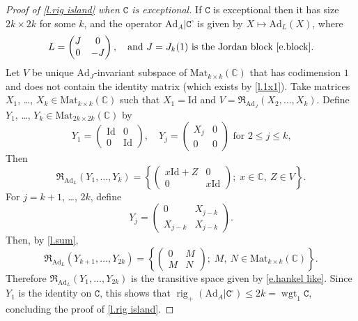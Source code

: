 \documentclass[10pt, a4paper]{amsart}
\theoremstyle{plain}
\theoremstyle{definition}
\theoremstyle{remark}
\theoremstyle{note}
\numberwithin{equation}{section}
\begin{document}
\begin{proof}[Proof of \cref{l.rig island} when ${\mathtt{C}}$ is exceptional]
If ${\mathtt{C}}$ is exceptional then it has size $2k \times 2k$ for some $k$,
and the operator ${\mathrm{Ad}}_A | {\mathtt{C}}^\square$ is given by $X \mapsto {\mathrm{Ad}}_L(X)$, where
$$
L = \begin{pmatrix}  J & 0 \\ 0 & -J \end{pmatrix},
\quad \text{and $J = J_k(1)$ is the Jordan block~\eqref{e.block}.}
$$
Let $V$ be unique ${\mathrm{Ad}}_J$-invariant subspace of ${\mathrm{Mat}}_{k \times k}({\mathbb{C}})$ that 
has codimension $1$ and does not contain the identity matrix (which exists by \cref{l.1x1}).
Take matrices $X_1$, \dots, $X_k \in {\mathrm{Mat}}_{k \times k}({\mathbb{C}})$ such that
$X_1 = {\mathrm{Id}}$
and 
$V = {\mathfrak{R}}_{{\mathrm{Ad}}_J} (X_2, \dots, X_k)$.
Define $Y_1$, \dots, $Y_k \in {\mathrm{Mat}}_{2k \times 2k} ({\mathbb{C}})$ by 
$$
Y_1 = \begin{pmatrix} {\mathrm{Id}} & 0 \\ 0 & {\mathrm{Id}} \end{pmatrix},
\quad 
Y_j = \begin{pmatrix} X_j & 0       \\ 0 & 0   \end{pmatrix} \text{ for $2 \le j \le k$,}
$$
Then
$$
{\mathfrak{R}}_{{\mathrm{Ad}}_L}(Y_1,\dots,Y_k) = 
\left\{ 
\begin{pmatrix} x{\mathrm{Id}} + Z & 0 \\ 0 & x {\mathrm{Id}} \end{pmatrix} ; \;
x \in {\mathbb{C}}, \ Z \in V
\right\}.
$$
For $j=k+1$, \dots, $2k$, define
$$
Y_j = \begin{pmatrix} 0   & X_{j-k} \\ X_{j-k} & X_{j-k} \end{pmatrix}. 
$$
Then, by \cref{l.sum}, 
$$
{\mathfrak{R}}_{{\mathrm{Ad}}_L}(Y_{k+1},\dots,Y_{2k}) = 
\left\{ 
\begin{pmatrix} 0 & M \\ M & N \end{pmatrix} ; \;
M, \ N \in {\mathrm{Mat}}_{k \times k}({\mathbb{C}})
\right\}.
$$
Therefore ${\mathfrak{R}}_{{\mathrm{Ad}}_L}(Y_1,\dots,Y_{2k})$ is the transitive space given by \eqref{e.hankel like}.
Since $Y_1$ is the identity on ${\mathtt{C}}$, this shows that 
$\operatorname{rig}_+({\mathrm{Ad}}_A|{\mathtt{C}}^\square) \le 2k = \operatorname{wgt}_1 {\mathtt{C}}$,
concluding the proof of \cref{l.rig island}.
\end{proof}
\end{document}
